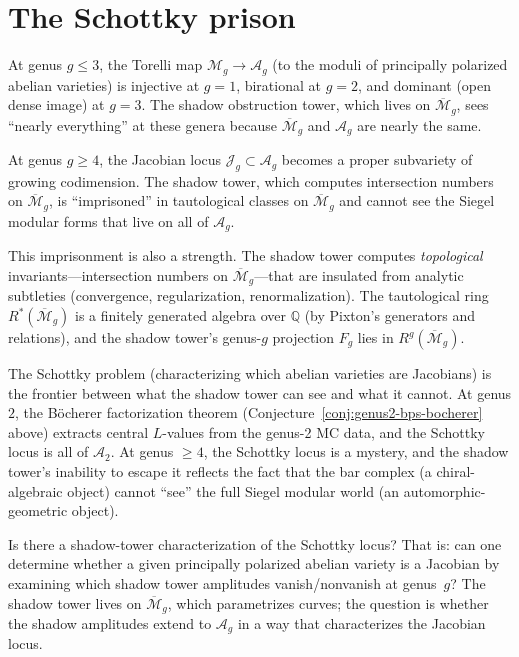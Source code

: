\documentclass[11pt]{article}
\newcommand{\cA}{\mathcal{A}}
\newcommand{\cM}{\mathcal{M}}
\newcommand{\cJ}{\mathcal{J}}
\newcommand{\Q}{\mathbb{Q}}
\begin{document}
\section{The Schottky prison}
\label{sec:motivic-schottky}

At genus $g \leq 3$, the Torelli map $\cM_g \to \cA_g$ (to the moduli of principally polarized abelian varieties) is injective at $g = 1$, birational at $g = 2$, and dominant (open dense image) at $g = 3$. The shadow obstruction tower, which lives on $\overline{\cM}_g$, sees ``nearly everything'' at these genera because $\overline{\cM}_g$ and $\cA_g$ are nearly the same.

At genus $g \geq 4$, the Jacobian locus $\cJ_g \subset \cA_g$ becomes a proper subvariety of growing codimension. The shadow tower, which computes intersection numbers on $\overline{\cM}_g$, is ``imprisoned'' in tautological classes on $\overline{\cM}_g$ and cannot see the Siegel modular forms that live on all of $\cA_g$.

This imprisonment is also a strength. The shadow tower computes \emph{topological} invariants---intersection numbers on $\overline{\cM}_g$---that are insulated from analytic subtleties (convergence, regularization, renormalization). The tautological ring $R^*(\overline{\cM}_g)$ is a finitely generated algebra over $\Q$ (by Pixton's generators and relations), and the shadow tower's genus-$g$ projection $F_g$ lies in $R^g(\overline{\cM}_g)$.

The Schottky problem (characterizing which abelian varieties are Jacobians) is the frontier between what the shadow tower can see and what it cannot. At genus $2$, the B\"ocherer factorization theorem (Conjecture~\ref{conj:genus2-bps-bocherer} above) extracts central $L$-values from the genus-2 MC data, and the Schottky locus is all of $\cA_2$. At genus $\geq 4$, the Schottky locus is a mystery, and the shadow tower's inability to escape it reflects the fact that the bar complex (a chiral-algebraic object) cannot ``see'' the full Siegel modular world (an automorphic-geometric object).

\begin{question}
Is there a shadow-tower characterization of the Schottky locus? That is: can one determine whether a given principally polarized abelian variety is a Jacobian by examining which shadow tower amplitudes vanish/nonvanish at genus~$g$? The shadow tower lives on $\overline{\cM}_g$, which parametrizes curves; the question is whether the shadow amplitudes extend to $\cA_g$ in a way that characterizes the Jacobian locus.
\end{question}
\end{document}
